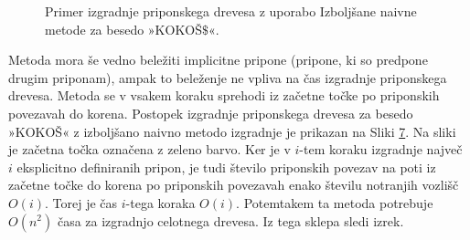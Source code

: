 \begin{figure}[htb]
    \begin{subfigure}[t]{0.3\linewidth}
        \subcaption*{}
        
        \centering
        \label{fig:IzbolšanaNaivna1}
    \end{subfigure}
    \hspace{0.5cm}
    \begin{subfigure}[t]{0.3\linewidth}
        \subcaption*{}
        
        \centering
        \label{fig:IzbolšanaNaivna2}
    \end{subfigure}
    \hspace{0.5cm}
    \begin{subfigure}[t]{0.3\linewidth}
        \subcaption*{}
        
        \centering
        \label{fig:IzbolšanaNaivna3}
    \end{subfigure}
    
    \begin{subfigure}[t]{0.3\linewidth}
        \subcaption*{}
        
        \centering
        \label{fig:IzbolšanaNaivna4}
    \end{subfigure}
    \hspace{0.5cm}
    \begin{subfigure}[t]{0.3\linewidth}
        \subcaption*{}
        
        \centering
        \label{fig:IzbolšanaNaivna5}
    \end{subfigure}
    \hspace{0.5cm}
    \begin{subfigure}[t]{0.3\textwidth}
        \subcaption*{}
        
        \centering
        \label{fig:IzbolšanaNaivna6}
    \end{subfigure}

       \caption{Primer izgradnje priponskega drevesa z uporabo Izboljšane naivne metode za besedo »KOKOŠ$\$$«.} 
        \label{fig:IzbolšanaNaivna}
\end{figure}

Metoda mora še vedno beležiti implicitne pripone (pripone, ki so predpone drugim priponam), ampak to beleženje ne vpliva na čas izgradnje priponskega drevesa. Metoda se v vsakem koraku sprehodi iz začetne točke po priponskih povezavah do korena. Postopek izgradnje priponskega drevesa za besedo »KOKOŠ« z izboljšano naivno metodo izgradnje je prikazan na Sliki \ref{fig:IzbolšanaNaivna}. Na sliki je začetna točka označena z zeleno barvo. Ker je v $i$-tem koraku izgradnje največ $i$ eksplicitno definiranih pripon, je tudi število priponskih povezav na poti iz začetne točke do korena po priponskih povezavah enako številu notranjih vozlišč $O(i)$. Torej je čas $i$-tega koraka $O(i)$. Potemtakem ta metoda potrebuje $O(n^2)$ časa za izgradnjo celotnega drevesa. Iz tega sklepa sledi izrek.

